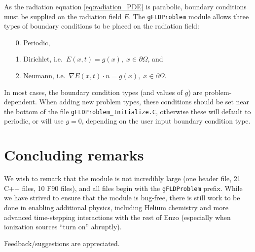 \documentclass[letterpaper,10pt]{article}
\renewcommand{\(}{\left(}
\renewcommand{\)}{\right)}
\begin{document}
As the radiation equation \eqref{eq:radiation_PDE} is parabolic,
boundary conditions must be supplied on the radiation field $E$.  The
{\tt gFLDProblem} module allows three types of boundary conditions to
be placed on the radiation field:
\begin{itemize}
\item[0.] Periodic,
\item[1.] Dirichlet, i.e.~$E(x,t) = g(x), \; x\in\partial\Omega$, and
\item[2.] Neumann, i.e.~$\nabla E(x,t)\cdot n = g(x), \; x\in\partial\Omega$.
\end{itemize}
In most cases, the boundary condition types (and values of $g$) are
problem-dependent.  When adding new problem types, these conditions
should be set near the bottom of the file {\tt gFLDProblem\_Initialize.C}, 
otherwise these will default to periodic, or will use $g=0$, depending
on the user input boundary condition type.



\section{Concluding remarks}
\label{sec:conclusions}

We wish to remark that the module is not incredibly large (one header
file, 21 C++ files, 10 F90 files), and all files begin with the 
{\tt gFLDProblem} prefix.  While we have strived to ensure that the
module is bug-free, there is still work to be done in enabling
additional physics, including Helium chemistry and more advanced
time-stepping interactions with the rest of Enzo (especially when
ionization sources ``turn on'' abruptly).  

Feedback/suggestions are appreciated.




\end{document}
